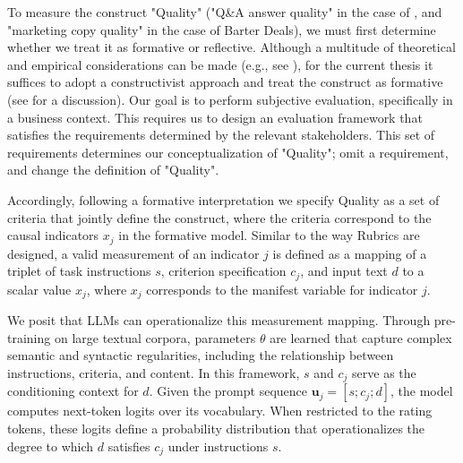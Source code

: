 To measure the construct "Quality" ("Q\&A answer quality" in the case of \citet{li_using_2022}, and "marketing copy quality" in the case of Barter Deals), we must first determine whether we treat it as formative or reflective. Although a multitude of theoretical and empirical considerations can be made (e.g., see \citet{coltman2008formative}), for the current thesis it suffices to adopt a constructivist approach and treat the construct as formative (see \citet{borsboom2003theoretical} for a discussion). Our goal is to perform subjective evaluation, specifically in a business context. This requires us to design an evaluation framework that satisfies the requirements determined by the relevant stakeholders. This set of requirements determines our conceptualization of "Quality"; omit a requirement, and change the definition of "Quality". 


Accordingly, following a formative interpretation we specify Quality as a set of criteria that jointly define the construct, where the criteria correspond to the causal indicators $x_j$ in the formative model. Similar to the way Rubrics are designed, a valid measurement of an indicator $j$ is defined as a mapping of a triplet of task instructions $s$, criterion specification $c_j$, and input text $d$ to a scalar value $x_j$, where $x_j$ corresponds to the manifest variable for indicator $j$. 

We posit that LLMs can operationalize this measurement mapping. Through pre-training on large textual corpora, parameters $\theta$ are learned that capture complex semantic and syntactic regularities, including the relationship between instructions, criteria, and content. In this framework, $s$ and $c_j$ serve as the conditioning context for $d$. Given the prompt sequence $\mathbf{u}_j = [s; c_j; d]$, the model computes next-token logits over its vocabulary. When restricted to the rating tokens, these logits define a probability distribution that operationalizes the degree to which $d$ satisfies $c_j$ under instructions $s$. 

